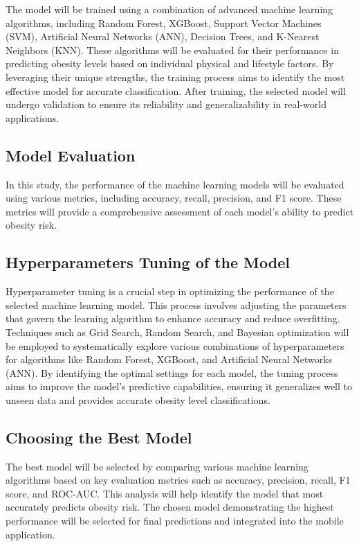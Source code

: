 The model will be trained using a combination of advanced machine learning algorithms, including Random Forest, XGBoost, Support Vector Machines (SVM), Artificial Neural Networks (ANN), Decision Trees, and K-Nearest Neighbors (KNN). These algorithms will be evaluated for their performance in predicting obesity levels based on individual physical and lifestyle factors. By leveraging their unique strengths, the training process aims to identify the most effective model for accurate classification. After training, the selected model will undergo validation to ensure its reliability and generalizability in real-world applications. 

 

\subsection{Model Evaluation }

In this study, the performance of the machine learning models will be evaluated using various metrics, including accuracy, recall, precision, and F1 score. These metrics will provide a comprehensive assessment of each model's ability to predict obesity risk. 

\subsection{Hyperparameters Tuning of the Model }

Hyperparameter tuning is a crucial step in optimizing the performance of the selected machine learning model. This process involves adjusting the parameters that govern the learning algorithm to enhance accuracy and reduce overfitting. Techniques such as Grid Search, Random Search, and Bayesian optimization will be employed to systematically explore various combinations of hyperparameters for algorithms like Random Forest, XGBoost, and Artificial Neural Networks (ANN). By identifying the optimal settings for each model, the tuning process aims to improve the model's predictive capabilities, ensuring it generalizes well to unseen data and provides accurate obesity level classifications. 

\subsection{Choosing the Best Model} 

The best model will be selected by comparing various machine learning algorithms based on key evaluation metrics such as accuracy, precision, recall, F1 score, and ROC-AUC. This analysis will help identify the model that most accurately predicts obesity risk. The chosen model demonstrating the highest performance will be selected for final predictions and integrated into the mobile application. 

